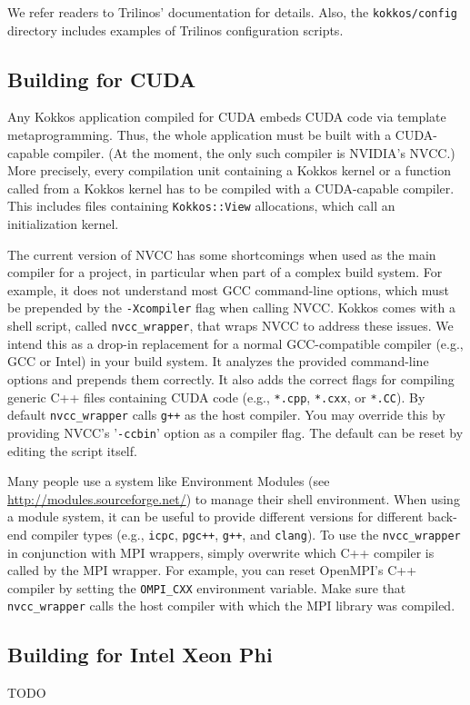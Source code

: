 We refer readers to Trilinos' documentation for details.  Also, the
\texttt{kokkos/config} directory includes examples of Trilinos
configuration scripts.
 
\subsection{Building for CUDA}\label{S:build:CUDA}

Any Kokkos application compiled for CUDA embeds CUDA code via template metaprogramming.
Thus, the whole application must be built with a CUDA-capable compiler.
(At the moment, the only such compiler is NVIDIA's NVCC.)
More precisely, every compilation unit containing a Kokkos kernel or a function called from a Kokkos kernel has to be compiled with a CUDA-capable compiler. 
This includes files containing \lstinline|Kokkos::View| allocations, which call an initialization kernel. 

The current version of NVCC has some shortcomings when used as the main compiler for a project, in particular when part of a complex build system.
For example, it does not understand most GCC command-line options, which must be prepended by the \lstinline|-Xcompiler| flag when calling NVCC. 
Kokkos comes with a shell script, called \lstinline|nvcc_wrapper|, that wraps NVCC to address these issues.
We intend this as a drop-in replacement for a normal GCC-compatible compiler (e.g., GCC or Intel) in your build system.
It analyzes the provided command-line options and prepends them correctly. 
It also adds the correct flags for compiling generic C++ files containing CUDA code (e.g., \verb!*.cpp!, \verb!*.cxx!, or \verb!*.CC!).
By default \lstinline|nvcc_wrapper| calls \verb!g++! as the host compiler.
You may override this by providing NVCC's '\lstinline|-ccbin|' option as a compiler flag.
The default can be reset by editing the script itself. 

Many people use a system like Environment Modules (see \\ \url{http://modules.sourceforge.net/}) to manage their shell environment.
When using a module system, it can be useful to provide different versions for different back-end compiler types (e.g., \verb!icpc!, \verb!pgc++!, \verb!g++!, and \verb!clang!).
To use the \lstinline|nvcc_wrapper| in conjunction with MPI wrappers, simply overwrite which C++ compiler is called by the MPI wrapper. 
For example, you can reset OpenMPI's C++ compiler by setting the \lstinline|OMPI_CXX| environment variable.
Make sure that \lstinline|nvcc_wrapper| calls the host compiler with which the MPI library was compiled.

\subsection{Building for Intel Xeon Phi}\label{S:build:Phi}

TODO

